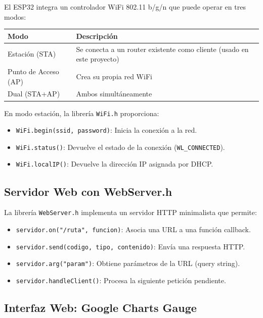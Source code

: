 \documentclass[12pt,a4paper]{article}
\begin{document}
El ESP32 integra un controlador WiFi 802.11 b/g/n que puede operar en tres modos:

\begin{center}
\begin{tabular}{lp{9cm}}
\toprule
\textbf{Modo} & \textbf{Descripción} \\
\midrule
Estación (STA) & Se conecta a un router existente como cliente (usado en este proyecto) \\
Punto de Acceso (AP) & Crea su propia red WiFi \\
Dual (STA+AP) & Ambos simultáneamente \\
\bottomrule
\end{tabular}
\end{center}

En modo estación, la librería \texttt{WiFi.h} proporciona:
\begin{itemize}
    \item \texttt{WiFi.begin(ssid, password)}: Inicia la conexión a la red.
    \item \texttt{WiFi.status()}: Devuelve el estado de la conexión (\texttt{WL\_CONNECTED}).
    \item \texttt{WiFi.localIP()}: Devuelve la dirección IP asignada por DHCP.
\end{itemize}

\subsection{Servidor Web con WebServer.h}

La librería \texttt{WebServer.h} implementa un servidor HTTP minimalista que permite:
\begin{itemize}
    \item \texttt{servidor.on("/ruta", funcion)}: Asocia una URL a una función callback.
    \item \texttt{servidor.send(codigo, tipo, contenido)}: Envía una respuesta HTTP.
    \item \texttt{servidor.arg("param")}: Obtiene parámetros de la URL (query string).
    \item \texttt{servidor.handleClient()}: Procesa la siguiente petición pendiente.
\end{itemize}

\subsection{Interfaz Web: Google Charts Gauge}
\end{document}

